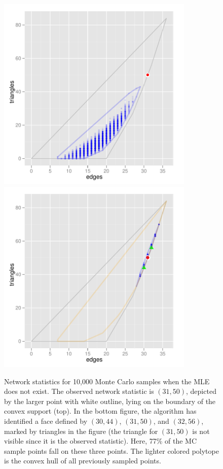 \begin{figure}[h!]
\centering
\includegraphics[width=3.7in]{Figures/MCsample-boundary}
\includegraphics[width=3.7in]{Figures/MCsample-77face}
\caption[Network statistics for 10,000 Monte Carlo samples when MLE does not exist]
{Network statistics for 10,000 Monte Carlo samples when the MLE does not exist.  
The observed network statistic is $(31,50)$, depicted by the larger point with white 
outline, lying on the boundary of the convex support (top).
In the bottom figure, the algorithm has identified a face defined by $(30,44)$, 
$(31,50)$, and $(32,56)$, marked by triangles in the figure (the triangle for 
$(31,50)$ is not visible since it is the observed statistic).  
Here, 77\% of the MC sample points fall on these three points.  The 
lighter colored polytope is the convex hull of all previously sampled points.
}
\label{F:MC face}
\end{figure}

